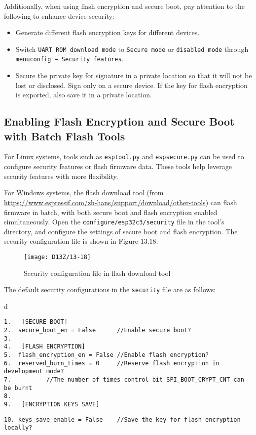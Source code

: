 \documentclass[a4paper,12pt]{book}
\begin{document}
Additionally, when using flash encryption and secure boot, pay attention to the following to enhance device security:

\begin{itemize}[leftmargin=1.5em]
    \item Generate different flash encryption keys for different devices.
    \item Switch \verb|UART ROM download mode| to \verb|Secure mode| or \verb|disabled mode| through \verb|menuconfig → Security features|.
    \item Secure the private key for signature in a private location so that it will not be lost or disclosed. Sign only on a secure device. If the key for flash encryption is exported, also save it in a private location.
\end{itemize}

\subsection{Enabling Flash Encryption and Secure Boot with Batch Flash Tools}
For Linux systems, tools such as \verb|esptool.py| and \verb|espsecure.py| can be used to configure security features or flash firmware data. These tools help leverage security features with more flexibility.

For Windows systems, the flash download tool (from \url{https://www.espressif.com/zh-hans/support/download/other-tools}) can flash firmware in batch, with both secure boot and flash encryption enabled simultaneously. Open the \verb|configure/esp32c3/security| file in the tool’s directory, and configure the settings of secure boot and flash encryption. The security configuration file is shown in Figure 13.18.

\begin{figure}[!h]
    \centering
    \texttt{[image: D13Z/13-18]}
    \caption{Security configuration file in flash download tool}
\end{figure}


The default security configurations in the \verb|security| file are as follows:

\begin{codebloc}
\begin{tabular}{d}
\vspace{2pt}
\begin{verbatim}
1.	 [SECURE BOOT]
2.  secure_boot_en = False      //Enable secure boot?
3.	
4.	 [FLASH ENCRYPTION]
5.  flash_encryption_en = False //Enable flash encryption?
6.  reserved_burn_times = 0     //Reserve flash encryption in development mode?
7.          //The number of times control bit SPI_BOOT_CRYPT_CNT can be burnt
8.	
9.	 [ENCRYPTION KEYS SAVE]
\end{verbatim}
\verb|10. keys_save_enable = False    //Save the key for flash encryption locally?|
\end{tabular}
\end{codebloc}
\end{document}
